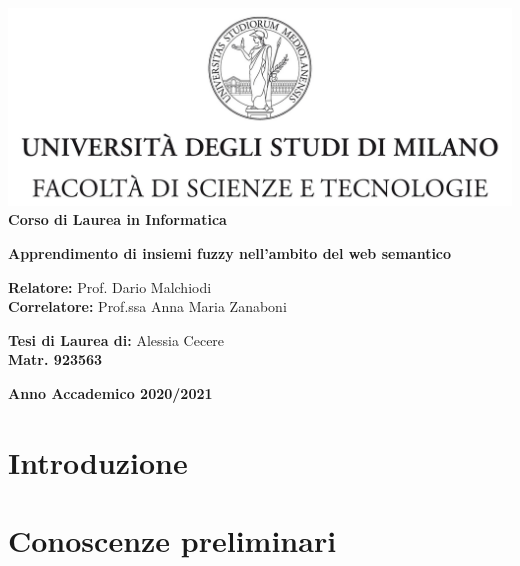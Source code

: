 \documentclass[12pt,a4paper]{report}
\begin{document}
\begin{titlepage}
\begin{center}
\includegraphics[width=\textwidth]{Logo.jpg}\\
{\large{\bf Corso di Laurea in Informatica}}
\end{center}
\vspace{12mm}
\begin{center}
{\huge{\bf Apprendimento di insiemi fuzzy nell'ambito del web semantico}}\\
\end{center}
\vspace{12mm}
\begin{flushleft}
{\large{\bf Relatore:}}
{\large{Prof. Dario Malchiodi}}\\
\vspace{4mm}
{\large{\bf Correlatore:}}
{\large{Prof.ssa Anna Maria Zanaboni}}\\
\end{flushleft}
\vspace{12mm}
\begin{flushright}
{\large{\bf Tesi di Laurea di:}}
{\large{Alessia Cecere}}\\
{\large{\bf Matr. 923563}}\\
\end{flushright}
\vspace{4mm}
\begin{center}
{\large{\bf Anno Accademico 2020/2021}}
\end{center}
\end{titlepage}


\tableofcontents


\chapter*{Introduzione}
\chapter{Conoscenze preliminari}
\end{document}
